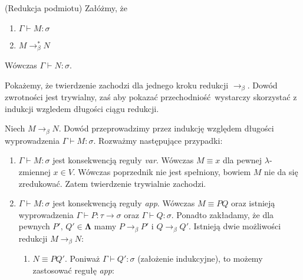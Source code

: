 \begin{lemat}(Redukcja podmiotu)\label{thm:subject_reduction}
    Załóżmy, że
    \begin{enumerate}[label=(\roman*)]
      \setlength\itemsep{0em}
      \item \(\Gamma\vdash M:\sigma\) 
      \item \(M\to^{*}_\beta N\)
    \end{enumerate}
    Wówczas \(\Gamma\vdash N:\sigma\).
\end{lemat}
\begin{dowod}
  Pokażemy, że twierdzenie zachodzi dla jednego kroku redukcji \(\to_\beta\). Dowód zwrotności jest trywialny, zaś aby pokazać przechodniość wystarczy skorzystać z indukcji wzgledem długości ciągu redukcji.

  Niech \(M\to_\beta N\). Dowód przeprowadzimy przez indukcję względem długości wyprowadzenia \(\Gamma\vdash M:\sigma\). Rozważmy następujące przypadki:
  \begin{enumerate}[label=(\alph*)]
    \setlength\itemsep{0em}
    \item    \(\Gamma\vdash     M:\sigma\)    jest    konsekwencją
    reguły   \emph{var}.  Wówczas   \(M\equiv   x\)  dla   pewnej
    \(\lambda\)-zmiennej  \(x\in   V\).  Wówczas   poprzednik  nie
    jest  spełniony,   bowiem  \(M\)  nie  da   się  zredukować.
    Zatem  twierdzenie  trywialnie zachodzi.  
  
    \item  \(\Gamma\vdash  M:\sigma\)  jest  konsekwencją  reguły
    \emph{app}.    Wówczas   \(M\equiv    PQ\)   oraz    istnieją
    wyprowadzenia  \(\Gamma\vdash   P:\tau\to\sigma\)  oraz  \(\Gamma
    \vdash   Q:\sigma\).   Ponadto   zakładamy,  że   dla   pewnych
    \(P',\,Q'\in\mathbf{\Lambda}\)   mamy   \(P\to_\beta   P'\)   i
    \(Q\to_\beta   Q'\).  Istnieją   dwie  możliwości   redukcji
    \(M\to_\beta N\):
      \begin{enumerate}[label=(\arabic*)]
        \setlength\itemsep{0em}
        \item \(N\equiv PQ'\). Poniważ \(\Gamma\vdash Q':\sigma\) (założenie indukcyjne), to możemy zastosować regułę \emph{app}:


\end{enumerate}
\end{enumerate}
\end{dowod}
